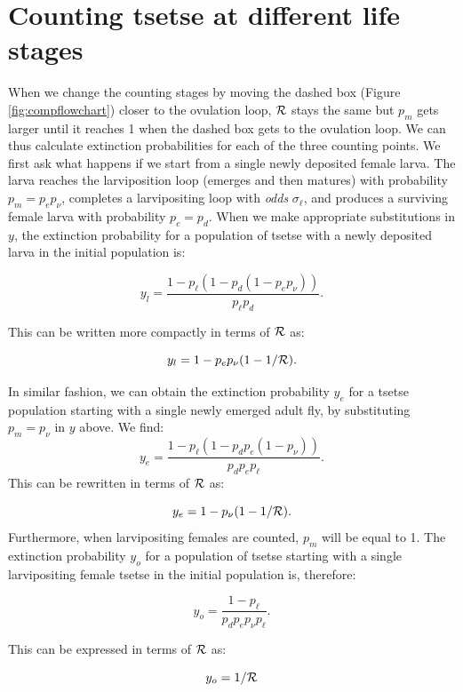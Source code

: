 \documentclass[smallextended]{svjour3}
\begin{document}
\section{Counting tsetse at different life stages}

When we change the counting stages by moving the dashed box (Figure \ref{fig:compflowchart}) closer to the ovulation loop, ${\cal R}$ stays the same but $p_m$ gets larger until it reaches 1 when the dashed box gets to the ovulation loop. We can thus calculate extinction probabilities for each of  the three counting points. We first ask what happens if we start from a single newly deposited female larva.
The larva reaches the larviposition loop (emerges and then matures) with probability $p_m = p_e p_{\nu}$, completes a larvipositing loop with \textit{odds} $\sigma_\ell$, and produces a surviving female larva with probability $p_c = p_d$. 
When we make appropriate substitutions in $y$, the extinction probability for a population of tsetse with a newly deposited larva in the initial population is:

$$y_l = \frac{1-p_{\ell}(1 - p_{d}(1 - p_{e}p_{\nu}))}{p_{\ell}p_{d}}.$$

This can be written more compactly in terms of ${\cal R}$ as:

\begin{equation}
	\label{larvExtinction}
	y_l = 1 - p_ep_{\nu}(1-1/{\cal R}).
\end{equation}

In similar fashion, we can obtain the extinction probability $y_e$ for a tsetse population starting with a single newly emerged adult fly, by substituting  $p_m = p_{\nu}$ in $y$ above.
We find:
$$ y_e=\frac{1- p_{\ell}(1 -p_{d}p_{e}(1- p_{\nu}))}{p_{d}p_{e}p_{\ell}}. $$ This can be rewritten in terms of ${\cal R}$ as:

\begin{equation}
	\label{emergeExtinction}
	y_e = 1 - p_{\nu}(1-1/{\cal R}).	
\end{equation}
Furthermore, when  larvipositing females are counted, $p_m$ will be equal to 1. The extinction probability $y_o$ for a population of tsetse starting with a single larvipositing female tsetse in the initial population is, therefore:

$$y_o = \frac{1-p_{\ell}}{p_{d}p_{e}p_{\nu}p_{\ell}}.$$

This can be expressed in terms of ${\cal R}$ as:

\begin{equation}
	\label{matureExtinction}
	y_o = 1/{\cal R}	
\end{equation}
\end{document}
